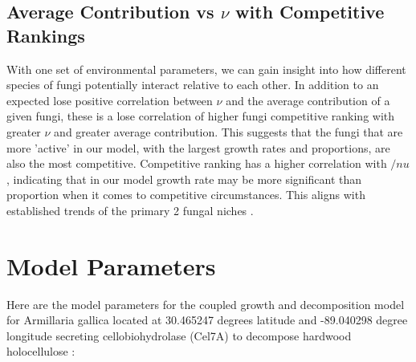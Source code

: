 \documentclass[12pt]{article}
\newenvironment{ColumnFigure}
{\par\medskip\noindent\minipage{\linewidth}}
{\endminipage\par\medskip}
\begin{document}
\begin{multicols}{2}
\subsection{Average Contribution vs $\nu$ with Competitive Rankings} %
With one set of environmental parameters, we can gain insight into how different species of fungi potentially interact relative to each other. In addition to an expected lose positive correlation between $\nu$ and the average contribution of a given fungi, these is a lose correlation of higher fungi competitive ranking with greater $\nu$ and greater average contribution. This suggests that the fungi that are more 'active' in our model, with the largest growth rates and proportions, are also the most competitive. Competitive ranking has a higher correlation with $/nu$, indicating that in our model growth rate may be more significant than proportion when it comes to competitive circumstances. This aligns with established trends of the primary 2 fungal niches \cite{Maynard2019}.

\end{multicols}
\newpage
\appendix
\section{Model Parameters}

Here are the model parameters for the coupled growth and decomposition model for Armillaria gallica located at 30.465247 degrees latitude and -89.040298 degree longitude secreting cellobiohydrolase (Cel7A) to decompose hardwood holocellulose \cite{Maynard2019, Kari2014}:
\end{document}
